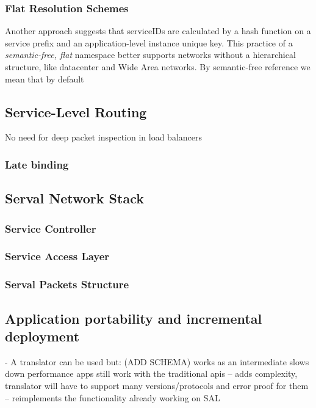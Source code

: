 \subsubsection{Flat Resolution Schemes}
Another approach suggests that serviceIDs are calculated by a hash function on a service prefix and an application-level instance unique key.
This practice of a \emph{semantic-free, flat} namespace better supports networks without a hierarchical structure, like datacenter and Wide Area networks.
By semantic-free\cite{Walfisha2004} reference we mean that by default 


\subsection{Service-Level Routing} 
No need for deep packet inspection in load balancers



\subsubsection{Late binding}
\subsection{Serval Network Stack}
\subsubsection{Service Controller}
\subsubsection{Service Access Layer}
\subsubsection{Serval Packets Structure}

\subsection{Application portability and incremental deployment}
- A translator can be used but: (ADD SCHEMA)
works as an intermediate
slows down performance
apps still work with the traditional apis
 -- adds complexity, translator will have to support many versions/protocols and error proof for them
 -- reimplements the functionality already working on SAL







